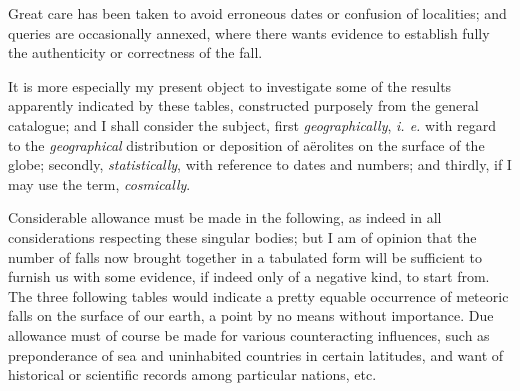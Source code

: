 \documentclass[a4paper, 12pt, oneside]{article}
\begin{document}
Great care has been taken to avoid erroneous dates or confusion of localities; and queries are occasionally annexed, where there wants evidence to establish fully the authenticity or correctness of the fall.

It is more especially my present object to investigate some of the results apparently indicated by these tables, constructed purposely from the general catalogue; and I shall consider the subject, first \emph{geographically}, \emph{i. e.} with regard to the \emph{geographical} distribution or deposition of aërolites on the surface of the globe; secondly, \emph{statistically}, with reference to dates and numbers; and thirdly, if I may use the term, \emph{cosmically}.

Considerable allowance must be made in the following, as indeed in all considerations respecting these singular bodies; but I am of opinion that the number of falls now brought together in a tabulated form will be sufficient to furnish us with some evidence, if indeed only of a negative kind, to start from. The three following tables would indicate a pretty equable occurrence of meteoric falls on the surface of our earth, a point by no means without importance. Due allowance must of course be made for various counteracting influences, such as preponderance of sea and uninhabited countries in certain latitudes, and want of historical or scientific records among particular nations, etc.
\end{document}
